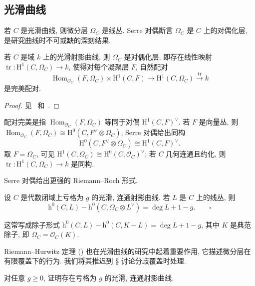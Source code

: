 \subsection{光滑曲线}\label{src:6.1.2-subsection}
若 $C$ 是光滑曲线, 则微分层 $\Omega_C$ 是线丛. Serre 对偶断言 $\Omega_C$ 是 $C$ 上的对偶化层, 是研究曲线时不可或缺的深刻结果.
\begin{theorem}\label{src:6.1.3}
若 $C$ 是域 $k$ 上的光滑射影曲线, 则 $\Omega_C$ 是对偶化层, 即存在线性映射 $\operatorname{tr}:\mathrm H^1(C,\allowbreak \Omega_C)\to\allowbreak k$, 使得对每个凝聚层 $F$, 自然配对
\[
\operatorname{Hom}_{\mathcal O_C}(F,\Omega_C)\times\mathrm H^1(C,F)\to\mathrm H^1(C,\Omega_C)\xrightarrow{\operatorname{tr}}k
\]
是完美配对.
\end{theorem}
\begin{proof}
见~\cite[定理 II.8.2]{Ser88} 和~\cite[推论 III.7.12]{Har77}.
\end{proof}
\begin{remark}\label{src:6.1.4}
配对完美是指 $\operatorname{Hom}_{\mathcal O_C}(F,\allowbreak \Omega_C)$ 等同于对偶 $\mathrm H^1(C,\allowbreak F)^\vee$. 若 $F$ 是向量丛, 则 $\operatorname{Hom}_{\mathcal O_C}(F,\allowbreak \Omega_C)\cong\mathrm H^0(C,\allowbreak F^\vee\otimes\Omega_C)$, Serre 对偶给出同构
\[
\mathrm H^0(C,F^\vee\otimes\Omega_C)\cong\mathrm H^1(C,F)^\vee.
\]
取 $F=\Omega_C$, 可见 $\mathrm H^1(C,\allowbreak \Omega_C)\cong\mathrm H^0(C,\allowbreak \mathcal O_C)^\vee$; 若 $C$ 几何连通且约化, 则 $\operatorname{tr}:\mathrm H^1(C,\allowbreak \Omega_C)\to\allowbreak k$ 是同构.
\end{remark}
Serre 对偶给出更强的 Riemann--Roch 形式.
\begin{theorem}\label{src:6.1.5}
设 $C$ 是代数闭域上亏格为 $g$ 的光滑, 连通射影曲线. 若 $L$ 是 $C$ 上的线丛, 则
\[
\mathrm h^0(C,L)-\mathrm h^0(C,\Omega_C\otimes L^\vee)=\deg L+1-g.\qquad\square
\]
\end{theorem}
\begin{remark}\label{src:6.1.6}
这常写成除子形式 $\mathrm h^0(C,\allowbreak L)-\mathrm h^0(C,\allowbreak K-L)=\deg L+1-g$, 其中 $K$ 是典范除子, 即 $\Omega_C=\mathcal O_C(K)$.
\end{remark}
Riemann--Hurwitz 定理 () 也在光滑曲线的研究中起着重要作用, 它描述微分层在有限覆盖下的行为. 我们将其推迟到 \S{} 讨论分歧覆盖时处理.
\begin{exercise}[容易]\label{src:6.1.7}
对任意 $g\geq0$, 证明存在亏格为 $g$ 的光滑, 连通射影曲线.
\end{exercise}
